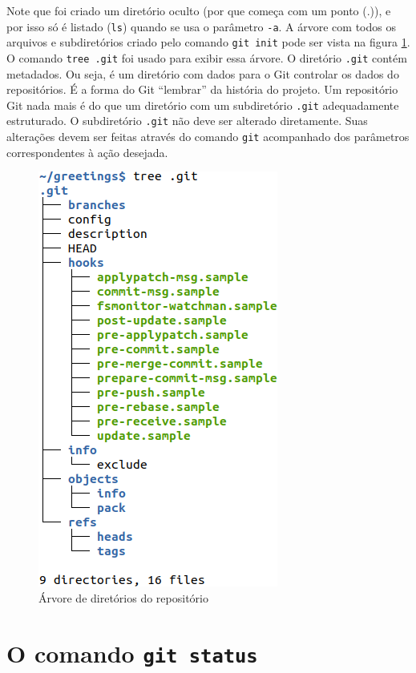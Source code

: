 \documentclass[a4paper]{book}
\begin{document}
Note que foi criado um diretório oculto (por que começa com
um ponto (.)), e por isso só é listado (\texttt{ls}) quando
se usa o parâmetro \texttt{-a}. A árvore com todos os arquivos
e subdiretórios criado pelo comando \texttt{git init} pode ser
vista na figura \ref{fig:02}. O comando \texttt{tree .git} foi
usado para exibir essa árvore. O diretório \texttt{.git} contém
metadados. Ou seja, é um diretório com dados para o Git
controlar os dados do repositórios. É a forma do Git
``lembrar'' da história do projeto.
Um repositório Git nada mais é do que um diretório com um
subdiretório \texttt{.git} adequadamente estruturado.
O subdiretório \texttt{.git} não deve ser alterado diretamente.
Suas alterações devem ser feitas através do comando
\texttt{git} acompanhado dos parâmetros correspondentes à ação
desejada.

\begin{figure}[ht]
\caption{Árvore de diretórios do repositório}
\label{fig:02}
\centering
\includegraphics[scale=0.6]{"images/02-Árvore de diretórios do repositório.png"}
\end{figure}

\section{O comando \texttt{git status}}
\end{document}

